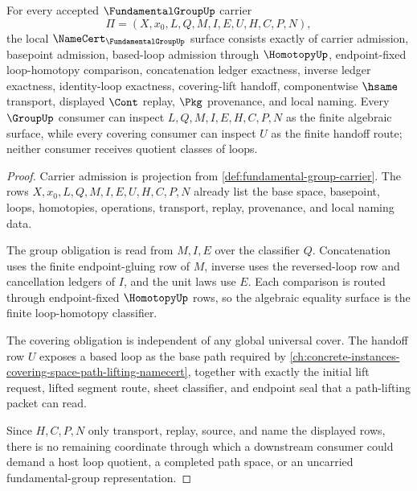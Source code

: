 \begin{theorem}
\label{thm:fundamental-group-namecert-obligations}
For every accepted $\FundamentalGroupUp$ carrier
$$
\Pi=(X,x_0,L,Q,M,I,E,U,H,C,P,N),
$$
the local $\NameCert_{\FundamentalGroupUp}$ surface consists exactly of carrier admission, basepoint admission, based-loop admission through $\HomotopyUp$, endpoint-fixed loop-homotopy comparison, concatenation ledger exactness, inverse ledger exactness, identity-loop exactness, covering-lift handoff, componentwise $\hsame$ transport, displayed $\Cont$ replay, $\Pkg$ provenance, and local naming. Every $\GroupUp$ consumer can inspect $L,Q,M,I,E,H,C,P,N$ as the finite algebraic surface, while every covering consumer can inspect $U$ as the finite handoff route; neither consumer receives quotient classes of loops.
\end{theorem}
\begin{proof}
Carrier admission is projection from \autoref{def:fundamental-group-carrier}. The rows $X,x_0,L,Q,M,I,E,U,H,C,P,N$ already list the base space, basepoint, loops, homotopies, operations, transport, replay, provenance, and local naming data.

The group obligation is read from $M,I,E$ over the classifier $Q$. Concatenation uses the finite endpoint-gluing row of $M$, inverse uses the reversed-loop row and cancellation ledgers of $I$, and the unit laws use $E$. Each comparison is routed through endpoint-fixed $\HomotopyUp$ rows, so the algebraic equality surface is the finite loop-homotopy classifier.

The covering obligation is independent of any global universal cover. The handoff row $U$ exposes a based loop as the base path required by \autoref{ch:concrete-instances-covering-space-path-lifting-namecert}, together with exactly the initial lift request, lifted segment route, sheet classifier, and endpoint seal that a path-lifting packet can read.

Since $H,C,P,N$ only transport, replay, source, and name the displayed rows, there is no remaining coordinate through which a downstream consumer could demand a host loop quotient, a completed path space, or an uncarried fundamental-group representation.
\end{proof}


